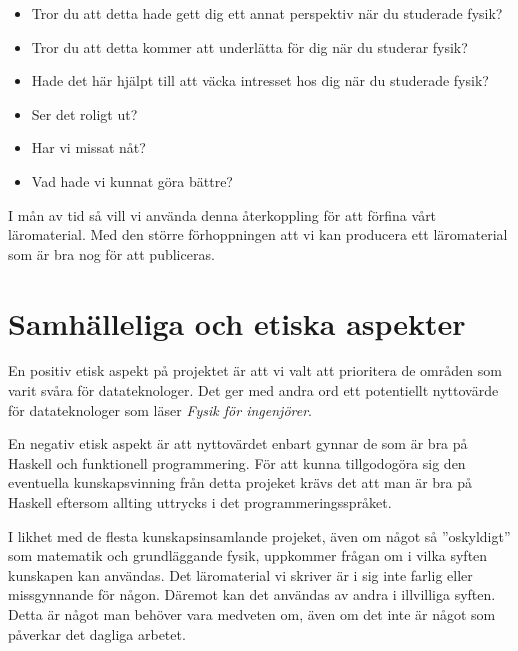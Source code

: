 \documentclass[12pt,a4paper]{article}
\begin{document}
\begin{itemize}
    \item Tror du att detta hade gett dig ett annat perspektiv när du studerade fysik?
    \item Tror du att detta kommer att underlätta för dig när du studerar fysik?
    \item Hade det här hjälpt till att väcka intresset hos dig när du studerade fysik?
    \item Ser det roligt ut?
    \item Har vi missat nåt?
    \item Vad hade vi kunnat göra bättre?
\end{itemize}

I mån av tid så vill vi använda denna återkoppling för att förfina vårt läromaterial. Med den större förhoppningen att vi kan producera ett läromaterial som är bra nog för att publiceras.

\section{Samhälleliga och etiska aspekter}

En positiv etisk aspekt på projektet är att vi valt att prioritera de områden som varit svåra för datateknologer. Det ger med andra ord ett potentiellt nyttovärde för datateknologer som läser \textit{Fysik för ingenjörer}.

En negativ etisk aspekt är att nyttovärdet enbart gynnar de som är bra på Haskell och funktionell programmering. För att kunna tillgodogöra sig den eventuella kunskapsvinning från detta projeket krävs det att man är bra på Haskell eftersom allting uttrycks i det programmeringsspråket.

I likhet med de flesta kunskapsinsamlande projeket, även om något så ''oskyldigt'' som matematik och grundläggande fysik, uppkommer frågan om i vilka syften kunskapen kan användas. Det läromaterial vi skriver är i sig inte farlig eller missgynnande för någon. Däremot kan det användas av andra i illvilliga syften. Detta är något man behöver vara medveten om, även om det inte är något som påverkar det dagliga arbetet.
\end{document}
